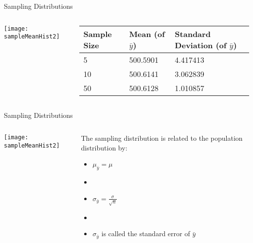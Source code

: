\documentclass[xcolor=dvipsnames]{beamer}
\begin{document}
\begin{frame}{Sampling Distributions}
	\begin{columns}
		\begin{column}{.5 \textwidth}
			\begin{center}
				\texttt{[image: sampleMeanHist2]}
			\end{center}
		\end{column}
		\begin{column}{.5 \textwidth}
			\begin{tabular}{|p{1.25cm}|p{1.7cm}|p{1.75cm}|} \hline
				\textbf{Sample Size}   &  \textbf{Mean (of $\bar{y}$)}  &  \textbf{Standard Deviation (of $\bar{y}$)} \\ \hline \hline
				5 &500.5901& 4.417413 \\ \hline
				10 &500.6141& 3.062839 \\ \hline
				50& 500.6128 &1.010857 \\ \hline
			\end{tabular}
		\end{column}
	\end{columns}
\end{frame}

\begin{frame}{Sampling Distributions}
	\begin{columns}
		\begin{column}{.5 \textwidth}
			\begin{center}
				\texttt{[image: sampleMeanHist2]}
			\end{center}
		\end{column}
		\begin{column}{.5 \textwidth}
			The sampling distribution is related to the population distribution by:
			\begin{itemize}
				\item $\mu_{\bar{y}} = \mu$ 
				\item[]
				\item $\sigma_{\bar{y}} =\frac{\sigma}{\sqrt{n}} $
				\item[]
				\item $\sigma_{\bar{y}}$ is called the standard error of $\bar{y}$
			\end{itemize}
		\end{column}
	\end{columns}
\end{frame}
\end{document}
